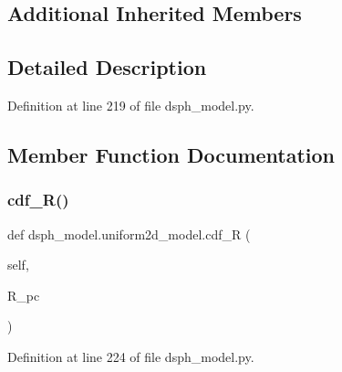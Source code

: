 \subsection*{Additional Inherited Members}


\subsection{Detailed Description}


Definition at line 219 of file dsph\+\_\+model.\+py.



\subsection{Member Function Documentation}
\mbox{\label{classdsph__model_1_1uniform2d__model_a2c038957a1031356eb5e011a8644df2d}} 
\subsubsection{\texorpdfstring{cdf\+\_\+\+R()}{cdf\_R()}}
{\footnotesize\ttfamily def dsph\+\_\+model.\+uniform2d\+\_\+model.\+cdf\+\_\+R (\begin{DoxyParamCaption}\item[{}]{self,  }\item[{}]{R\+\_\+pc }\end{DoxyParamCaption})}



Definition at line 224 of file dsph\+\_\+model.\+py.



